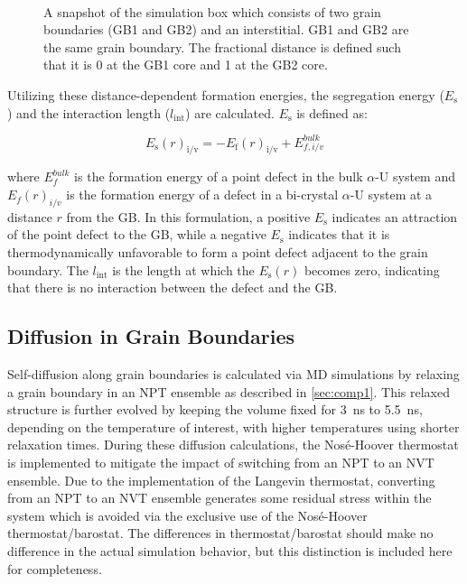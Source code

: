 \documentclass[review]{elsarticle}
\begin{document}
\begin{figure}[h!]
\centering
{}\\
\caption{A snapshot of the simulation box which consists of two grain boundaries (GB1 and GB2) and an interstitial. GB1 and GB2 are the same grain boundary. The fractional distance is defined such that it is 0 at the GB1 core and 1 at the GB2 core.}
\label{fig:GB}
\end{figure}

Utilizing these distance-dependent formation energies, the segregation energy ($E_{\mathrm{s}}$) and the interaction length ($l_{\mathrm{int}}$) are calculated. $E_{\mathrm{s}}$ is defined as:

\begin{equation}
\label{eq:eform2}
E_{\mathrm{s}}(r)_{\mathrm{i/v}} = -E_{\mathrm{f}}(r)_{\mathrm{i/v}} + E_{f,i/v}^{bulk}
\end{equation}

\noindent where $E_{f}^{bulk}$ is the formation energy of a point defect in the bulk $\alpha$-U system and $E_f(r)_{i/v}$ is the formation energy of a defect in a bi-crystal $\alpha$-U system at a distance $r$ from the GB. In this formulation, a positive $E_{\mathrm{s}}$ indicates an attraction of the point defect to the GB, while a negative $E_{\mathrm{s}}$ indicates that it is thermodynamically unfavorable to form a point defect adjacent to the grain boundary. The  $l_{\mathrm{int}}$ is the length at which the $E_{\mathrm{s}}(r)$ becomes zero, indicating that there is no interaction between the defect and the GB.  

\subsection{Diffusion in Grain Boundaries}\label{sec:comp2}
\par Self-diffusion along grain boundaries is calculated via MD simulations by relaxing a grain boundary in an NPT ensemble as described in \cref{sec:comp1}. This relaxed structure is further evolved by keeping the volume fixed for 3~ns to 5.5~ns, depending on the temperature of interest, with higher temperatures using shorter relaxation times. During these diffusion calculations, the Nos\'{e}-Hoover thermostat is implemented to mitigate the impact of switching from an NPT to an NVT ensemble. Due to the implementation of the Langevin thermostat, converting from an NPT to an NVT ensemble generates some residual stress within the system which is avoided via the exclusive use of the Nos\'{e}-Hoover thermostat/barostat. The differences in thermostat/barostat should make no difference in the actual simulation behavior, but this distinction is included here for completeness. 
\end{document}
